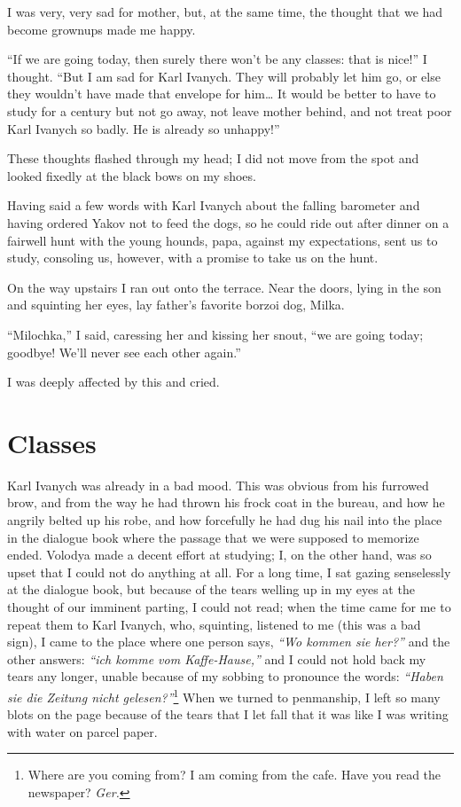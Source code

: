 I was very, very sad for mother, but, at the same time, the thought that we had become grownups made me happy.

``If we are going today, then surely there won't be any classes: that is nice!'' I thought. ``But I am sad for Karl Ivanych. They will probably let him go, or else they wouldn't have made that envelope for him\ldots{} It would be better to have to study for a century but not go away, not leave mother behind, and not treat poor Karl Ivanych so badly. He is already so unhappy!'' %

These thoughts flashed through my head; I did not move from the spot and looked fixedly at the black bows on my shoes.

Having said a few words with Karl Ivanych about the falling barometer and having ordered Yakov not to feed the dogs, so he could ride out after dinner on a fairwell hunt with the young hounds, papa, against my expectations, sent us to study, consoling us, however, with a promise to take us on the hunt.

On the way upstairs I ran out onto the terrace. Near the doors, lying in the son and squinting her eyes, lay father's favorite borzoi dog, Milka.

``Milochka,'' I said, caressing her and kissing her snout, ``we are going today; goodbye! We'll never see each other again.'' %

I was deeply affected by this and cried.

\chapter{Classes} %

Karl Ivanych was already in a bad mood. This was obvious from his furrowed brow, and from the way he had thrown his frock coat in the bureau,  and how he angrily belted up his robe, and how forcefully he had dug his nail into the place in the dialogue book where the passage that we were supposed to memorize ended. Volodya made a decent effort at studying; I, on the other hand, was so upset that I could not do anything at all. For a long time, I sat gazing senselessly at the dialogue book, but because of the tears welling up in my eyes at the thought of our imminent parting, I could not read; when the time came for me to repeat them to Karl Ivanych, who, squinting, listened to me (this was a bad sign), I came to the place where one person says, \textit{``Wo kommen sie her?''} and the other answers: \textit{``ich komme vom Kaffe-Hause,''} and I could not hold back my tears any longer, unable because of my sobbing to pronounce the words: \textit{``Haben sie die Zeitung nicht gelesen?''}\footnote{Where are you coming from? I am coming from the cafe. Have you read the newspaper? \textit{Ger.}} When we turned to penmanship, I left so many blots on the page because of the tears that I let fall that it was like I was writing with water on parcel paper.

